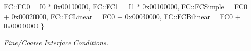 \begin{DoxyCompactItemize}
\hyperlink{namespaceUintah_1_1PhaseField_aeb51fe956fe07f1487f5878f4039f27cae950aa1aad6fdf2c9b8012a0e1f8c1fa}{F\+C\+::\+F\+C0} = I0 $\ast$ 0x00100000, 
\hyperlink{namespaceUintah_1_1PhaseField_aeb51fe956fe07f1487f5878f4039f27cad752b12b0fc874dddc6f67101b900706}{F\+C\+::\+F\+C1} = I1 $\ast$ 0x00100000, 
\hyperlink{namespaceUintah_1_1PhaseField_aeb51fe956fe07f1487f5878f4039f27ca6a316dd1139b99e2a8af86106b3cf045}{F\+C\+::\+F\+C\+Simple} = F\+C0 + 0x00020000, 
\newline
\hyperlink{namespaceUintah_1_1PhaseField_aeb51fe956fe07f1487f5878f4039f27ca7460527a4d3065117218d8822530ed6a}{F\+C\+::\+F\+C\+Linear} = F\+C0 + 0x00030000, 
\hyperlink{namespaceUintah_1_1PhaseField_aeb51fe956fe07f1487f5878f4039f27ca529374bd8795ca8cdf1e8257ecce2f3a}{F\+C\+::\+F\+C\+Bilinear} = F\+C0 + 0x00040000
 \}\begin{DoxyCompactList}\small\item\em Fine/\+Coarse Interface Conditions. \end{DoxyCompactList}
\end{DoxyCompactItemize}
